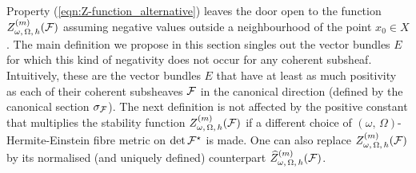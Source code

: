 \documentclass[12pt]{article}
\begin{document}
  Property (\ref{eqn:Z-function_alternative}) leaves the door open to the function $Z_{\omega,\,\Omega,\,h}^{(m)}({\cal F})$ assuming negative values outside a neighbourhood of the point $x_0\in X$. The main definition we propose in this section singles out the vector bundles $E$ for which this kind of negativity does not occur for any coherent subsheaf. Intuitively, these are the vector bundles $E$ that have at least as much positivity as each of their coherent subsheaves ${\cal F}$ in the canonical direction (defined by the canonical section $\sigma_{{\cal F}}$). The next definition is not affected by the positive constant that multiplies the stability function $Z_{\omega,\,\Omega,\,h}^{(m)}({\cal F})$ if a different choice of $(\omega,\,\Omega)$-Hermite-Einstein fibre metric on $\det{\cal F}^\star$ is made. One can also replace $Z_{\omega,\,\Omega,\,h}^{(m)}({\cal F})$ by its normalised (and uniquely defined) counterpart $\widehat{Z}_{\omega,\,\Omega,\,h}^{(m)}({\cal F})$.  
\end{document}
